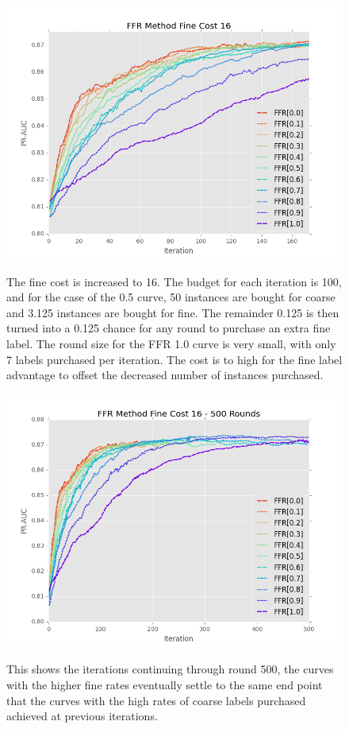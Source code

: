 \documentclass[ms]{nuthesis}
\begin{document}
\FloatBarrier
\begin{figure}[!htb]
	\centering
    \includegraphics[width=1.0\columnwidth]{fig/FFR_PR_Cost16_rnds0_171}
    \label{fig:FFR_PR_Cost16_rnds0_171}
    \caption{The fine cost is increased to 16. The budget for each iteration is 100, and
    for the case of the 0.5 curve, 50 instances are bought for coarse and 3.125 instances are
    bought for fine. The remainder 0.125 is then turned into a 0.125 chance for any round to
    purchase an extra fine label. The round size for the FFR 1.0 curve is very small, with only
    7 labels purchased per iteration. The cost is to high for the fine label advantage to offset
    the decreased number of instances purchased.}
\end{figure}
\FloatBarrier


\FloatBarrier
\begin{figure}[!htb]
	\centering
    \includegraphics[width=1.0\columnwidth]{fig/FFR_PR_Cost16_rnds0_500}
    \label{fig:FFR_PR_Cost16_rnds0_500}
    \caption{This shows the iterations continuing through round 500, the curves
    with the higher fine rates eventually settle to the same end point that the
    curves with the high rates of coarse labels purchased achieved at previous
    iterations.}
\end{figure}
\FloatBarrier
\end{document}
